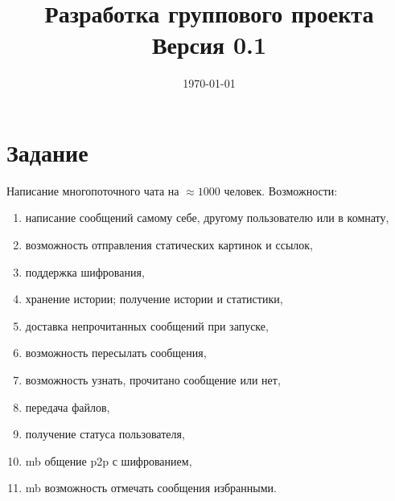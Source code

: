 \documentclass[a4paper,12pt]{extarticle}
\begin{document}
	\title{Разработка группового проекта\\Версия 0.1}
	\date{\today}
	\maketitle

	\setlength{\parskip}{0.5ex}
	
	\section{Задание}
	Написание многопоточного чата на $\approx\!\!1000$ человек.	Возможности:
	\begin{enumerate}
		\item написание сообщений самому себе, другому пользователю или в комнату,
		\item возможность отправления статических картинок и ссылок,
		\item поддержка шифрования,
		\item хранение истории; получение истории и статистики,
		\item доставка непрочитанных сообщений при запуске,
		\item возможность пересылать сообщения,
		\item возможность узнать, прочитано сообщение или нет,
		\item передача файлов,
		\item получение статуса пользователя,
		\item mb общение p2p с шифрованием,
		\item mb возможность отмечать сообщения избранными.
	\end{enumerate}
	
\end{document}
